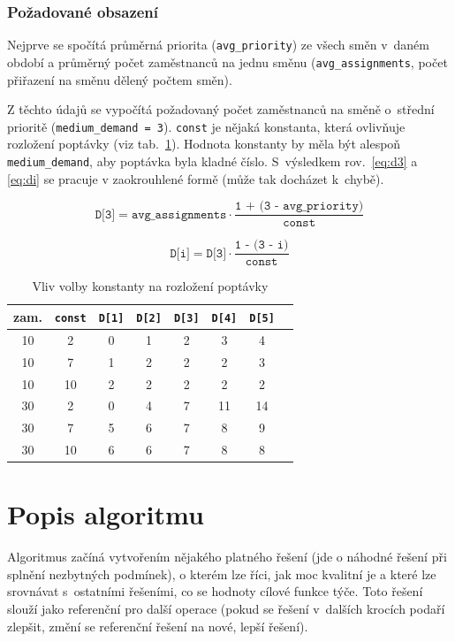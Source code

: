 \documentclass[twoside]{ctuthesis}
\begin{document}
\subsubsection{Požadované obsazení}
Nejprve se spočítá průměrná priorita (\texttt{avg\_priority}) ze všech směn v~daném období a průměrný počet zaměstnanců na jednu směnu (\texttt{avg\_assignments}, počet přiřazení na směnu dělený počtem směn).

Z těchto údajů se vypočítá požadovaný počet zaměstnanců na směně o~střední prioritě (\texttt{medium\_demand = 3}). \texttt{const} je nějaká konstanta, která ovlivňuje rozložení poptávky (viz tab.~\ref{tab:demandfactor}). Hodnota konstanty by měla být alespoň \texttt{medium\_demand}, aby poptávka byla kladné číslo. S~výsledkem rov.~\ref{eq:d3} a \ref{eq:di} se pracuje v zaokrouhlené formě (může tak docházet k~chybě).

\begin{equation}
	\label{eq:d3}
	\texttt{D[3]} = \texttt{avg\_assignments} \cdot \frac{\texttt{1 + (3 - avg\_priority})}{\texttt{const}}
\end{equation}

\begin{equation}
	\label{eq:di}
	\texttt{D[i]} = \texttt{D[3]} \cdot \frac{\texttt{1 - (3 - i})}{\texttt{const}}
\end{equation}

\begin{table}[h]
	\caption{Vliv volby konstanty na rozložení poptávky}
	\label{tab:demandfactor}
	\begin{tabular}{c|ccccccc}
		\hline
		zam. & \texttt{const} & \texttt{D[1]} & \texttt{D[2]} & \texttt{D[3]} & \texttt{D[4]} & \texttt{D[5]} \\
		\hline
		\rowcolor{Gray}
		10 & 2 & 0 & 1 & 2 & 3 & 4 \\
		10 & 7 & 1 & 2 & 2 & 2 & 3 \\
		\rowcolor{Gray}
		10 & 10 & 2 & 2 & 2 & 2 & 2 \\
		30 & 2 & 0 & 4 & 7 & 11 & 14 \\
		\rowcolor{Gray}
		30 & 7 & 5 & 6 & 7 & 8 & 9 \\
		30 & 10 & 6 & 6 & 7 & 8 & 8 \\
		\hline
	\end{tabular}
\end{table}

\section{Popis algoritmu}
Algoritmus začíná vytvořením nějakého platného řešení (jde o náhodné řešení při splnění nezbytných podmínek), o kterém lze říci, jak moc kvalitní je a které lze srovnávat s~ostatními řešeními, co se hodnoty cílové funkce týče. Toto řešení slouží jako referenční pro další operace (pokud se řešení v~dalších krocích podaří zlepšit, změní se referenční řešení na nové, lepší řešení).
\end{document}
